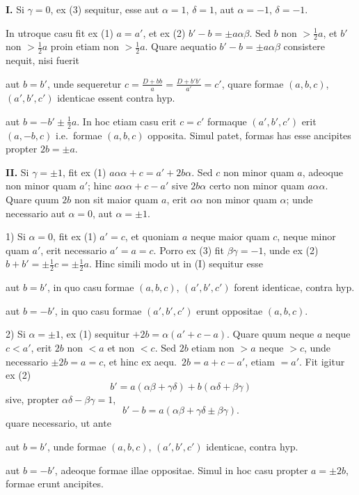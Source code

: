 \documentclass[12pt,a4paper]{article}
\theoremstyle{plain}
\begin{document}
\textbf{I.} Si $\gamma = 0$, ex (3) sequitur, esse aut $\alpha = 1$, $\delta = 1$, aut $\alpha = -1$, $\delta = -1$.

In utroque casu fit ex (1) $a = a'$, et ex (2) $b' - b = \pm a\alpha\beta$. Sed $b$ non $> \frac{1}{2}a$, et $b'$ non $> \frac{1}{2}a$ proin etiam non $> \frac{1}{2}a$. Quare aequatio $b' - b = \pm a\alpha\beta$ consistere nequit, nisi fuerit

aut $b = b'$, unde sequeretur $c = \frac{D+bb}{a} = \frac{D+b'b'}{a'} = c'$, quare formae $(a,b,c)$, $(a',b',c')$ identicae essent contra hyp.

aut $b = -b' \pm \frac{1}{2}a$. In hoc etiam casu erit $c = c'$ formaque $(a',b',c')$ erit $(a,-b,c)$ i.e.~formae $(a,b,c)$ opposita. Simul patet, formas has esse ancipites propter $2b = \pm a$.

\textbf{II.} Si $\gamma = \pm 1$, fit ex (1) $a\alpha\alpha + c = a' + 2b\alpha$. Sed $c$ non minor quam $a$, adeoque non minor quam $a'$; hinc $a\alpha\alpha + c - a'$ sive $2b\alpha$ certo non minor quam $a\alpha\alpha$. Quare quum $2b$ non sit maior quam $a$, erit $\alpha\alpha$ non minor quam $\alpha$; unde necessario aut $\alpha = 0$, aut $\alpha = \pm 1$.

1) Si $\alpha = 0$, fit ex (1) $a' = c$, et quoniam $a$ neque maior quam $c$, neque minor quam $a'$, erit necessario $a' = a = c$. Porro ex (3) fit $\beta\gamma = -1$, unde ex (2) $b + b' = \pm \frac{1}{2}c = \pm \frac{1}{2}a$. Hinc simili modo ut in (I) sequitur esse

aut $b = b'$, in quo casu formae $(a,b,c)$, $(a',b',c')$ forent identicae, contra hyp.

aut $b = -b'$, in quo casu formae $(a',b',c')$ erunt oppositae $(a,b,c)$.

2) Si $\alpha = \pm 1$, ex (1) sequitur $+2b = \alpha(a' + c - a)$. Quare quum neque $a$ neque $c < a'$, erit $2b$ non $< a$ et non $< c$. Sed $2b$ etiam non $> a$ neque $> c$, unde necessario $\pm 2b = a = c$, et hinc ex aequ.~$2b = a + c - a'$, etiam $= a'$. Fit igitur ex (2)
\[
b' = a(\alpha\beta + \gamma\delta) + b(\alpha\delta + \beta\gamma)
\]
sive, propter $\alpha\delta - \beta\gamma = 1$,
\[
b' - b = a(\alpha\beta + \gamma\delta \pm \beta\gamma).
\]
quare necessario, ut ante

aut $b = b'$, unde formae $(a,b,c)$, $(a',b',c')$ identicae, contra hyp.

aut $b = -b'$, adeoque formae illae oppositae. Simul in hoc casu propter $a = \pm 2b$, formae erunt ancipites.
\end{document}
